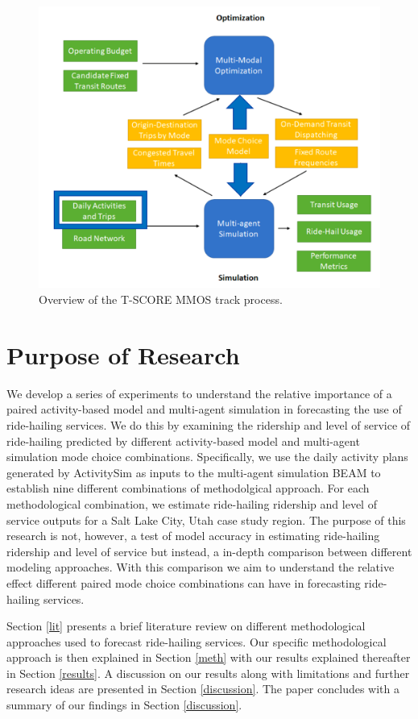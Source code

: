 \documentclass[simple, masters, twoside]{byuthesis}
\begin{document}
\begin{figure}

{\centering \includegraphics[width=0.75\linewidth]{pics/mmos_mode} 

}

\caption{Overview of the T-SCORE MMOS track process.}\label{fig:mmos}
\end{figure}

\hypertarget{purpose-of-research}{%
\section{Purpose of Research}\label{purpose-of-research}}

We develop a series of experiments to understand the relative importance of a paired activity-based model and multi-agent simulation in forecasting the use of ride-hailing services. We do this by examining the ridership and level of service of ride-hailing predicted by different activity-based model and multi-agent simulation mode choice combinations. Specifically, we use the daily activity plans generated by ActivitySim as inputs to the multi-agent simulation BEAM to establish nine different combinations of methodolgical approach. For each methodological combination, we estimate ride-hailing ridership and level of service outputs for a Salt Lake City, Utah case study region. The purpose of this research is not, however, a test of model accuracy in estimating ride-hailing ridership and level of service but instead, a in-depth comparison between different modeling approaches. With this comparison we aim to understand the relative effect different paired mode choice combinations can have in forecasting ride-hailing services.

Section \ref{lit} presents a brief literature review on different methodological approaches used to forecast ride-hailing services. Our specific methodological approach is then explained in Section \ref{meth} with our results explained thereafter in Section \ref{results}. A discussion on our results along with limitations and further research ideas are presented in Section \ref{discussion}. The paper concludes with a summary of our findings in Section \ref{discussion}.
\end{document}
